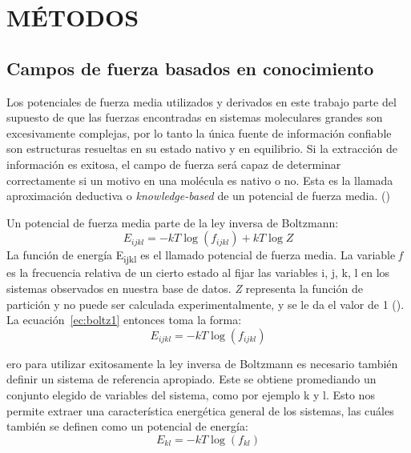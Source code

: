 \newpage
\section*{MÉTODOS}
\par{}
\subsection{Campos de fuerza basados en conocimiento}
\par
Los potenciales de fuerza media utilizados y derivados en este trabajo parte del supuesto de que las fuerzas encontradas en sistemas moleculares grandes son excesivamente complejas, por lo tanto la única fuente de información confiable son estructuras resueltas en su estado nativo y en equilibrio. 
Si la extracción de información es exitosa, el campo de fuerza será capaz de determinar correctamente si un motivo en una molécula es nativo o no. 
Esta es la llamada aproximación deductiva o \textit{knowledge-based} de un potencial de fuerza 
media. (\cite{Sippl1993})
\par
Un potencial de fuerza media parte de la ley inversa de Boltzmann:
\begin{equation}
E_{ijkl} = -kT\log(f_{ijkl}) + kT\log Z \label{ec:boltz1}
\end{equation}
La función de energía E\textsubscript{ijkl} es el llamado potencial de fuerza media. 
La variable \textit{f} es la frecuencia relativa de un cierto estado al fijar las variables i, j, k, l en 
los sistemas observados en nuestra base de datos. 
\textit{Z} representa la función de partición y no puede ser calculada experimentalmente, y se le da el 
valor de 1 (\cite{Sippl1993}). 
La ecuación~\eqref{ec:boltz1}  entonces toma la forma:
\begin{equation}
E_{ijkl} = -kT\log(f_{ijkl}) \label{ec:boltz2}
\end{equation}
\par
ero para utilizar exitosamente la ley inversa de Boltzmann es necesario también definir un sistema de referencia apropiado. 
Este se obtiene promediando un conjunto elegido de variables del sistema, como por ejemplo k y l.
Esto nos permite extraer una característica energética general de los sistemas, las cuáles también se definen como un potencial de energía:
\begin{equation}
E_{kl} = -kT\log(f_{kl}) \label{ec:boltzref}
\end{equation}
\par
